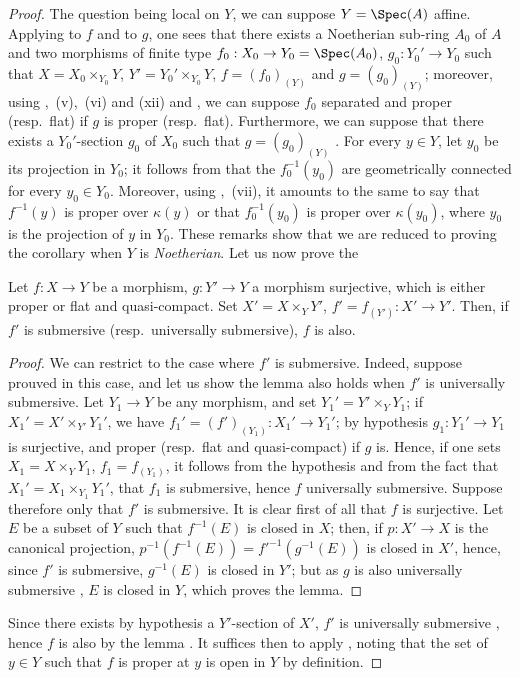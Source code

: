 \begin{proof}
The question being local on $Y$, we can suppose $Y=\Spec(A)$ affine.
Applying  to $f$ and to $g$, one sees that there exists a Noetherian sub-ring $A_0$ of $A$ and two morphisms of finite type $f_0:X_0\to Y_0=\Spec(A_0)$, $g_0:Y_0'\to Y_0$ such that $X=X_0\times_{Y_0}Y$, $Y'=Y_0'\times_{Y_0}Y$, $f=(f_0)_{(Y)}$ and $g=(g_0)_{(Y)}$; moreover, using ,~(v),~(vi) and (xii) and , we can suppose $f_0$ separated and proper (resp.\ flat) if $g$ is proper (resp.\ flat).
Furthermore, we can suppose that there exists a $Y_0'$-section $g_0$ of $X_0$ such that $g=(g_0)_{(Y)}$ .
For every $y\in Y$, let $y_0$ be its projection in $Y_0$; it follows from  that the $f_0^{-1}(y_0)$ are geometrically connected for every $y_0\in Y_0$.
Moreover, using ,~(vii), it amounts to the same to say that $f^{-1}(y)$ is proper over $\kappa(y)$ or that $f_0^{-1}(y_0)$ is proper over $\kappa(y_0)$, where $y_0$ is the projection of $y$ in $Y_0$.
These remarks show that we are reduced to proving the corollary when $Y$ is \emph{Noetherian}.
Let us now prove the

\begin{lemma}[15.7.11.1]
\label{IV.15.7.11.1}
Let $f:X\to Y$ be a morphism, $g:Y'\to Y$ a morphism surjective, which is either proper or flat and quasi-compact.
Set $X'=X\times_Y Y'$, $f'=f_{(Y')}:X'\to Y'$.
Then, if $f'$ is submersive (resp.\ universally submersive), $f$ is also.
\end{lemma}

\begin{proof}
We can restrict to the case where $f'$ is submersive.
Indeed, suppose prouved in this case, and let us show the lemma also holds when $f'$ is universally submersive.
Let $Y_1\to Y$ be any morphism, and set $Y_1'=Y'\times_Y Y_1$; if $X_1'=X'\times_{Y'} Y_1'$, we have $f_1'=(f')_{(Y_1)}:X_1'\to Y_1'$; by hypothesis $g_1:Y_1'\to Y_1$ is surjective, and proper (resp.\ flat and quasi-compact) if $g$ is.
Hence, if one sets $X_1=X\times_Y Y_1$, $f_1=f_{(Y_1)}$, it follows from the hypothesis and from the fact that $X_1'=X_1\times_{Y_1} Y_1'$, that $f_1$ is submersive, hence $f$ universally submersive.
Suppose therefore only that $f'$ is submersive.
It is clear first of all that $f$ is surjective.
Let $E$ be a subset of $Y$ such that $f^{-1}(E)$ is closed in $X$; then, if $p:X'\to X$ is the canonical projection,
$p^{-1}(f^{-1}(E))=f'^{-1}(g^{-1}(E))$ is closed in $X'$, hence, since $f'$ is submersive, $g^{-1}(E)$ is closed in $Y'$; but as $g$ is also universally submersive , $E$ is closed in $Y$, which proves the lemma.
\end{proof}

Since there exists by hypothesis a $Y'$-section of $X'$, $f'$ is universally submersive , hence $f$ is also by the lemma .
It suffices then to apply , noting that the set of $y\in Y$ such that $f$ is proper at $y$ is open in $Y$ by definition.
\end{proof}
